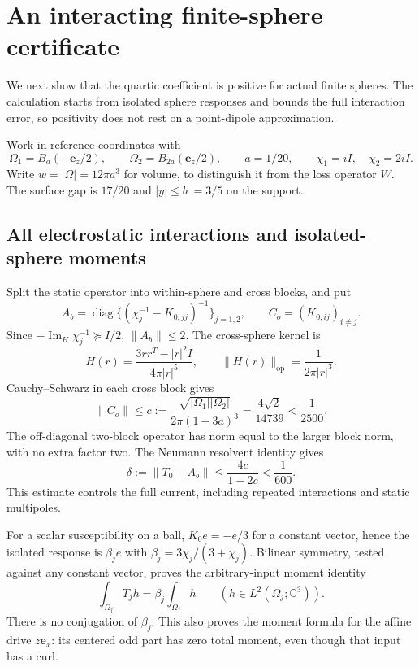 \documentclass[11pt]{article}
\newcommand{\ImH}{\operatorname{Im}_{\!H}}
\newcommand{\norm}[1]{\lVert #1\rVert}
\newcommand{\abs}[1]{\lvert #1\rvert}
\newcommand{\ex}{\mathbf e_x}
\newcommand{\ez}{\mathbf e_z}
\begin{document}
\section{An interacting finite-sphere certificate}\label{sec:hetero}
We next show that the quartic coefficient is positive for actual finite spheres. The calculation starts from isolated sphere responses and bounds the full interaction error, so positivity does not rest on a point-dipole approximation.

Work in reference coordinates with
\begin{equation}\label{eq:spheres}
 \Omega_1=B_a(-\ez/2),\qquad\Omega_2=B_{2a}(\ez/2),
 \qquad a=1/20,\qquad\chi_1=iI,\quad\chi_2=2iI.
\end{equation}
Write $w=\abs\Omega=12\pi a^3$ for volume, to distinguish it from the loss operator $W$. The surface gap is $17/20$ and $\abs y\leq b:=3/5$ on the support.

\subsection{All electrostatic interactions and isolated-sphere moments}
Split the static operator into within-sphere and cross blocks, and put
\[
 A_b=\operatorname{diag}\{(\chi_j^{-1}-K_{0,jj})^{-1}\}_{j=1,2},
 \qquad C_o=(K_{0,ij})_{i\ne j}.
\]
Since $-\ImH\chi_j^{-1}\succeq I/2$, $\norm{A_b}\leq2$. The cross-sphere kernel is
\begin{equation}\label{eq:H-kernel}
 H(r)=\frac{3rr^T-\abs r^2I}{4\pi\abs r^5},\qquad
 \norm{H(r)}_{\mathrm{op}}=\frac1{2\pi\abs r^3}.
\end{equation}
Cauchy--Schwarz in each cross block gives
\begin{equation}\label{eq:cross-bound}
 \norm{C_o}\leq c:=\frac{\sqrt{\abs{\Omega_1}\abs{\Omega_2}}}
 {2\pi(1-3a)^3}=\frac{4\sqrt2}{14739}<\frac1{2500}.
\end{equation}
The off-diagonal two-block operator has norm equal to the larger block norm, with no extra factor two. The Neumann resolvent identity gives
\begin{equation}\label{eq:delta}
 \delta:=\norm{T_0-A_b}\leq\frac{4c}{1-2c}<\frac1{600}.
\end{equation}
This estimate controls the full current, including repeated interactions and static multipoles.

For a scalar susceptibility on a ball, $K_0e=-e/3$ for a constant vector, hence the isolated response is $\beta_je$ with $\beta_j=3\chi_j/(3+\chi_j)$. Bilinear symmetry, tested against any constant vector, proves the arbitrary-input moment identity
\begin{equation}\label{eq:ball-moment}
 \int_{\Omega_j}T_jh=\beta_j\int_{\Omega_j}h
 \qquad(h\in L^2(\Omega_j;\mathbb C^3)).
\end{equation}
There is no conjugation of $\beta_j$. This also proves the moment formula for the affine drive $z\ex$: its centered odd part has zero total moment, even though that input has a curl.
\end{document}
